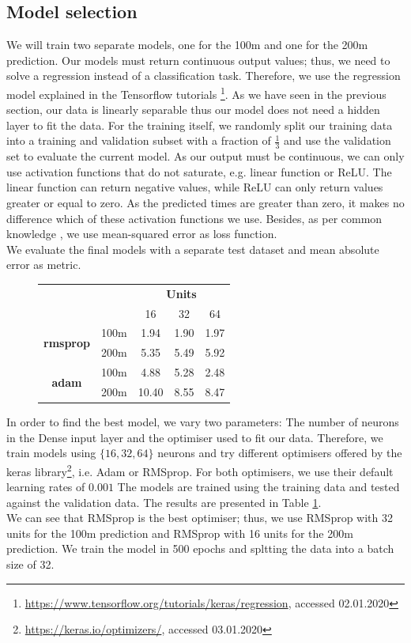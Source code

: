 \subsection{Model selection}
We will train two separate models, one for the 100m and one for the 200m prediction. Our models must return continuous output values; thus, we need to solve a regression instead of a classification task. Therefore, we use the regression model explained in the Tensorflow tutorials \footnote{\url{https://www.tensorflow.org/tutorials/keras/regression}, accessed 02.01.2020}. As we have seen in the previous section, our data is linearly separable thus our model does not need a hidden layer to fit the data.
For the training itself, we randomly split our training data into a training and validation subset with a fraction of $\frac{1}{3}$ and use the validation set to evaluate the current model. As our output must be continuous, we can only use activation functions that do not saturate, e.g. linear function or ReLU. The linear function can return negative values, while ReLU can only return values greater or equal to zero. As the predicted times are greater than zero, it makes no difference which of these activation functions we use. Besides, as per common knowledge \cite{Reed.1999}, we use mean-squared error as loss function.\\
We evaluate the final models with a separate test dataset and mean absolute error as metric.\\
\begin{figure}[ht]
\begin{centering}
\begin{tabular}{|cc|c|c|c|}\hline
    &&\multicolumn{3}{c|}{\textbf{Units}}\\
    & & 16 & 32 & 64 \\\hline
    \multirow{2}{*}{\textbf{rmsprop}}&100m&1.94&1.90&1.97\\\cline{2-5}
    &200m&5.35&5.49&5.92\\\hline
    \multirow{2}{*}{\textbf{adam}}&100m&4.88&5.28&2.48\\\cline{2-5}
    &200m&10.40&8.55&8.47\\\hline
\end{tabular}
\label{tab:hyperparam_units}
\end{centering}
\end{figure}
In order to find the best model, we vary two parameters: The number of neurons in the Dense input layer and the optimiser used to fit our data. Therefore, we train models using $\{16, 32, 64\}$ neurons and try different optimisers offered by the keras library\footnote{\url{https://keras.io/optimizers/}, accessed 03.01.2020}, i.e. Adam or RMSprop. For both optimisers, we use their default learning rates of $0.001$ The models are trained using the training data and tested against the validation data. The results are presented in Table \ref{tab:hyperparam_units}.\\
We can see that RMSprop is the best optimiser; thus, we use RMSprop with 32 units for the 100m prediction and RMSprop with 16 units for the 200m prediction. We train the model in 500 epochs and spltting the data into a batch size of 32.
